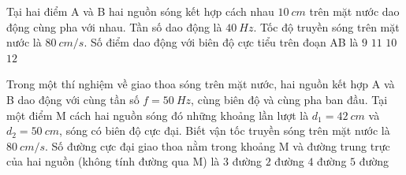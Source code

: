 	\begin{ex}%
		Tại hai điểm A và B hai nguồn sóng kết hợp cách nhau $10\ cm$ trên mặt nước dao động cùng pha với nhau. Tần số dao động là $40\ Hz$. Tốc độ truyền sóng trên mặt nước là $80\ cm/s$. Số điểm dao động với biên độ cực tiểu trên đoạn AB là
		\choice
		{$9$}
		{$11$}
		{\True $10$}
		{$12$}
	\end{ex}
	\begin{ex}%
		Trong một thí nghiệm về giao thoa sóng trên mặt nước, hai nguồn kết hợp A và B dao động với cùng tần số $f=50\ Hz$, cùng biên độ và cùng pha ban đầu. Tại một điểm M cách hai nguồn sóng đó những khoảng lần lượt là $d_1=42\ cm$ và $d_2=50\ cm$, sóng có biên độ cực đại. Biết vận tốc truyền sóng trên mặt nước là $80\  cm/s$. Số đường cực đại giao thoa nằm trong khoảng M và đường trung trực của hai nguồn (không tính đường qua M) là
		\choice
		{$3$ đường}
		{$2$ đường}
		{\True $4$ đường}
		{$5$ đường}
	\end{ex}
